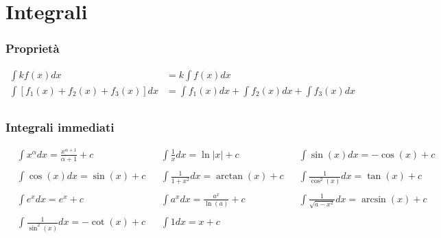\documentclass[a4paper]{article}
\begin{document}
	
	
	
	\newpage
	\section{Integrali}
	\subsubsection{Proprietà}
	\begin{align*}
		\int k f(x) dx &= k \int f(x) dx\\
		\int \left[f_1(x)+f_2(x)+f_3(x)\right]dx &= \int f_1(x)dx + \int f_2(x)dx + \int f_3(x)dx\\
	\end{align*}
	
	\subsubsection{Integrali immediati}
	\begin{align*}
		&\int x^\alpha dx             = \frac{x^{\alpha + 1}}{\alpha + 1} +c & &\int \frac{1}{x}dx      = \ln|x| + c              &  &\int \sin (x) dx               = -\cos(x) + c    \\
		                            &                                        &  \\
		&\int \cos (x) dx             = \sin (x) +c                          & &\int \frac{1}{1+x^2}dx  = \arctan (x) +c          & &\int \frac{1}{\cos^2 (x)}dx    = \tan (x) + c    \\
		                            &                                        &  \\
		&\int e^x dx                  = e^x +c                               & &\int a^x dx             = \frac{a^x}{\ln (a)} + c & &\int \frac{1}{\sqrt{a-x^2}}dx  = \arcsin (x) + c \\
		                            &  \\
		&\int \frac{1}{\sin^2 (x)}dx  = -\cot(x) + c                         & &\int 1 dx               = x+c                     &\\
	\end{align*}
	
\end{document}
